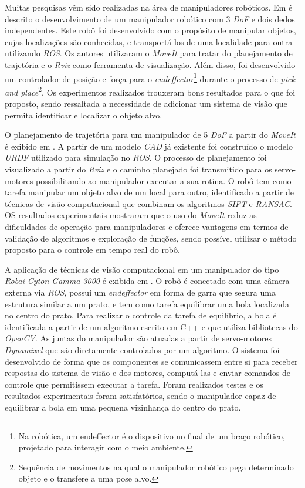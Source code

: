 \par Muitas pesquisas vêm sido realizadas na área de manipuladores robóticos. Em \cite{hernandez2017design} é descrito o desenvolvimento de um manipulador robótico com 3 \textit{\acs{DoF}} e dois dedos independentes. Este robô foi desenvolvido com o propósito de manipular objetos, cujas localizações são conhecidas, e transportá-los de uma localidade para outra utilizando \textit{\acs{ROS}}. Os autores utilizaram o \textit{MoveIt} para tratar do planejamento de trajetória e o \textit{Rviz} como ferramenta de visualização. Além disso, foi desenvolvido um controlador de posição e força para o \textit{endeffector}\footnote{Na robótica, um endeffector é o dispositivo no final de um braço robótico, projetado para interagir com o meio ambiente.} durante o processo de \textit{pick and place}\footnote{Sequência de movimentos na qual o manipulador robótico pega determinado objeto e o transfere a uma pose alvo.}. Os experimentos realizados trouxeram bons resultados para o que foi proposto, sendo ressaltada a necessidade de adicionar um sistema de visão que permita identificar e localizar o objeto alvo. 

O planejamento de trajetória para um manipulador de 5 \textit{\acs{DoF}} a partir do \textit{MoveIt} é exibido em \cite{zhang2019motion}. A partir de um  modelo \textit{\acs{CAD}} já existente foi construído o modelo \textit{\acs{URDF}} utilizado para simulação no \textit{\acs{ROS}}. O processo de planejamento foi visualizado a partir do \textit{Rviz} e o caminho planejado foi transmitido para os servo-motores possibilitando ao manipulador executar a sua rotina. O robô tem como tarefa manipular um objeto alvo de um local para outro, identificado a partir de técnicas de visão computacional que combinam os algoritmos \textit{SIFT} e \textit{RANSAC}. OS resultados experimentais mostraram que o uso do \textit{MoveIt} reduz as dificuldades de operação para manipuladores e oferece vantagens em termos de validação de algoritmos e exploração de funções, sendo possível utilizar o método proposto para o controle em tempo real do robô. 

\par A aplicação de técnicas de visão computacional em um manipulador do tipo \textit{Robai Cyton Gamma 3000} é exibida em \cite{khan2018ros}. O robô é conectado com uma câmera externa via \textit{\acs{ROS}}, possui um \textit{endeffector} em forma de garra que segura uma estrutura similar a um prato, e tem como tarefa equilibrar uma bola localizada no centro do prato. Para realizar o controle da tarefa de equilíbrio, a bola é identificada a partir de um algoritmo escrito em C++ e que utiliza bibliotecas do \textit{\acs{OpenCV}}. As juntas do manipulador são atuadas a partir de servo-motores \textit{Dynamixel} que são diretamente controlados por um algoritmo. O sistema foi desenvolvido de forma que os componentes se comunicassem entre si para receber respostas do sistema de visão e dos motores, computá-las e enviar comandos de controle que permitissem executar a tarefa. Foram realizados testes e os resultados experimentais foram satisfatórios, sendo o manipulador capaz de equilibrar a bola em uma pequena vizinhança do centro do prato.


